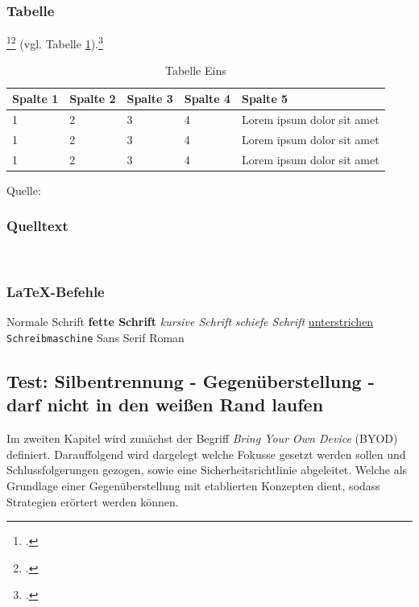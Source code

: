 \subsubsection{Tabelle}
\Blindtext\footcite[Vgl.][34]{Digitaloekonomie}\footcite[Vgl.][]{mesh}
\blinditemize
\blindtext (vgl. Tabelle \ref{tabelle_eins}).\footcite[Vgl.][511]{Tanenbaum2016}
\begin{table}[!htb]\label{tabelle_eins}
    \setlength{\arrayrulewidth}{1pt}
    \begin{threeparttable}
        \caption{Tabelle Eins}
        \begin{tabularx}{\textwidth}{|X|X|X|X|X|}
            \hline
            Spalte 1 & Spalte 2 & Spalte 3 & Spalte 4 & Spalte 5 \tabularnewline \hline
            1 & 2 & 3 & 4 & Lorem ipsum dolor sit amet \tabularnewline \hline
            1 & 2 & 3 & 4 & Lorem ipsum dolor sit amet \tabularnewline \hline
            1 & 2 & 3 & 4 & Lorem ipsum dolor sit amet \tabularnewline \hline
        \end{tabularx}
        \begin{tablenotes}[flushleft]
            \item \normalsize{Quelle: \cite[][207]{bsp}}
        \end{tablenotes}
    \end{threeparttable}
\end{table}

\subsubsection{Quelltext}

\captionsetup{width=1\textwidth}
\label{Red Hat} \\


\subsubsection{LaTeX-Befehle}
    \textnormal{Normale Schrift} 
    \textbullet\addspace \textbf{fette Schrift} 
    \textbullet\addspace \textit{kursive Schrift} 
    \textbullet\addspace \textsl{schiefe Schrift} 
    \textbullet\addspace \underline{unterstrichen} 
    \textbullet\addspace \texttt{Schreib\-ma\-schi\-ne} 
    \textbullet\addspace \textsf{Sans Serif} 
    \textbullet\addspace \textrm{Roman} 

\subsection{Test: Silbentrennung - Gegenüberstellung - darf nicht in den weißen Rand laufen}
Im zweiten Kapitel wird zunächst der Begriff \textit{Bring Your Own Device} (BYOD) definiert. Darauffolgend wird dargelegt welche Fokusse gesetzt werden sollen und Schlussfolgerungen gezogen, sowie eine Sicherheitsrichtlinie abgeleitet. Welche als Grundlage einer Gegenüberstellung mit etablierten Konzepten dient, sodass Strategien erörtert werden können. 

